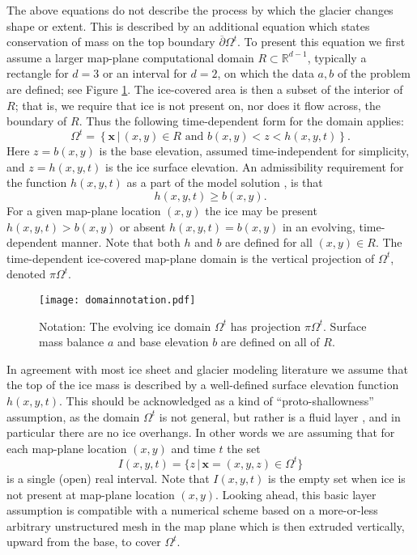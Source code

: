 \documentclass[letterpaper,final,12pt,reqno]{amsart}
\newcommand{\RR}{\mathbb{R}}
\newcommand{\bx}{\mathbf{x}}
\begin{document}
The above equations do not describe the process by which the glacier changes shape or extent.  This is described by an additional equation which states conservation of mass on the top boundary $\overline{\partial} \Omega^t$.  To present this equation we first assume a larger map-plane computational domain $R\subset \RR^{d-1}$, typically a rectangle for $d=3$ or an interval for $d=2$, on which the data $a,b$ of the problem are defined; see Figure \ref{fig:domainnotation}.  The ice-covered area is then a subset of the interior of $R$; that is, we require that ice is not present on, nor does it flow across, the boundary of $R$.  Thus the following time-dependent form for the domain applies:
\begin{equation}
\Omega^t = \left\{\bx\,\big|\,(x,y)\in R \text{ and } b(x,y) < z < h(x,y,t)\right\}.  \label{Omegat}
\end{equation}
Here $z=b(x,y)$ is the base elevation, assumed time-independent for simplicity, and $z=h(x,y,t)$ is the ice surface elevation.  An admissibility requirement for the function $h(x,y,t)$ as a part of the model solution \cite{Bueler2016}, is that
\begin{equation}
h(x,y,t) \ge b(x,y).  \label{admissibility}
\end{equation}
For a given map-plane location $(x,y)$ the ice may be present $h(x,y,t)>b(x,y)$ or absent $h(x,y,t)=b(x,y)$ in an evolving, time-dependent manner.  Note that both $h$ and $b$ are defined for all $(x,y)\in R$.  The time-dependent ice-covered map-plane domain is the vertical projection of $\Omega^t$, denoted $\pi \Omega^t$.

\begin{figure}[h]
\begin{center}
\texttt{[image: domainnotation.pdf]}
\end{center}
\caption{Notation: The evolving ice domain $\Omega^t$ has projection $\pi \Omega^t$.  Surface mass balance $a$ and base elevation $b$ are defined on all of $R$.}
\label{fig:domainnotation}
\end{figure}

In agreement with most ice sheet and glacier modeling literature we assume that the top of the ice mass is described by a well-defined surface elevation function $h(x,y,t)$.  This should be acknowledged as a kind of ``proto-shallowness'' assumption, as the domain $\Omega^t$ is not general, but rather is a fluid layer \cite{Bueler2020}, and in particular there are no ice overhangs.  In other words we are assuming that for each map-plane location $(x,y)$ and time $t$ the set
\begin{equation}
I(x,y,t) = \{z\,\big|\,\bx=(x,y,z) \in \Omega^t\} \label{intervalassume}
\end{equation}
is a single (open) real interval.  Note that $I(x,y,t)$ is the empty set when ice is not present at map-plane location $(x,y)$.  Looking ahead, this basic layer assumption is compatible with a numerical scheme based on a more-or-less arbitrary unstructured mesh in the map plane which is then extruded vertically, upward from the base, to cover $\Omega^t$.
\end{document}
